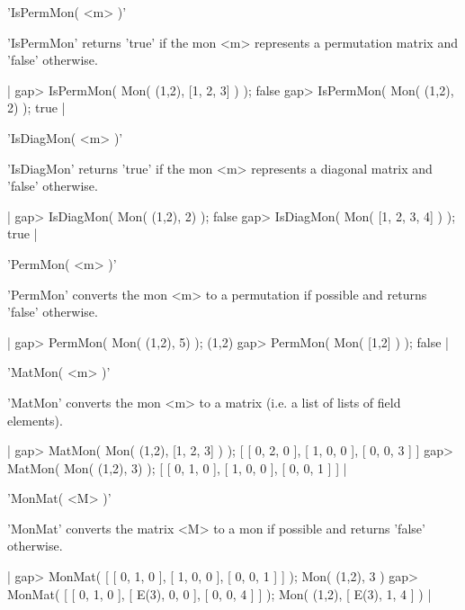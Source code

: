 
'IsPermMon( <m> )'

'IsPermMon' returns 'true' if the mon <m> represents a 
permutation matrix and 'false' otherwise.

|    gap> IsPermMon( Mon( (1,2), [1, 2, 3] ) );
    false
    gap> IsPermMon( Mon( (1,2), 2) );
    true |


'IsDiagMon( <m> )'

'IsDiagMon' returns 'true' if the mon <m> represents a diagonal matrix
and 'false' otherwise.

|    gap> IsDiagMon( Mon( (1,2), 2) );
    false
    gap> IsDiagMon( Mon( [1, 2, 3, 4] ) );
    true |


'PermMon( <m> )'

'PermMon' converts the mon <m> to a permutation if possible and
returns 'false' otherwise.

|    gap> PermMon( Mon( (1,2), 5) );
    (1,2)
    gap> PermMon( Mon( [1,2] ) );
    false |


'MatMon( <m> )'

'MatMon' converts the mon <m> to a matrix (i.e. a list of lists
of field elements).

|    gap> MatMon( Mon( (1,2), [1, 2, 3] ) );
    [ [ 0, 2, 0 ], [ 1, 0, 0 ], [ 0, 0, 3 ] ]
    gap> MatMon( Mon( (1,2), 3) );
    [ [ 0, 1, 0 ], [ 1, 0, 0 ], [ 0, 0, 1 ] ] |


'MonMat( <M> )'

'MonMat' converts the matrix <M> to a mon if possible and returns
'false' otherwise.

|    gap> MonMat( [ [ 0, 1, 0 ], [ 1, 0, 0 ], [ 0, 0, 1 ] ] );
    Mon( (1,2), 3 )
    gap> MonMat( [ [ 0, 1, 0 ], [ E(3), 0, 0 ], [ 0, 0, 4 ] ] );
    Mon(
      (1,2),
      [ E(3), 1, 4 ]
    ) |


